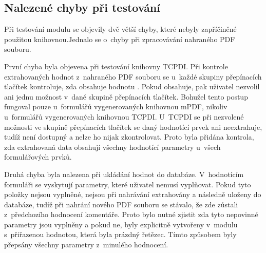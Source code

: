 \subsection{Nalezené chyby při testování}
Při testování modulu se objevily dvě větší chyby, které nebyly zapříčiněné použitou knihovnou.Jednalo se o~chyby při zpracovávání nahraného PDF souboru.
\par
První chyba byla objevena při testování knihovny TCPDI. Při kontrole extrahovaných hodnot z~nahraného PDF souboru se u~každé skupiny přepínacích tlačítek kontroluje, zda obsahuje hodnotu . Pokud obsahuje, pak uživatel nezvolil ani jednu možnost v~dané skupině přepínacích tlačítek. Bohužel tento postup fungoval pouze u~formulářů vygenerovaných knihovnou mPDF, nikoliv u~formulářů vygenerovaných knihovnou TCPDI. U~TCPDI se při nezvolené možnosti ve skupině přepínacích tlačítek se daný hodnotící prvek ani neextrahuje, tudíž není dostupný a nelze ho nijak zkontrolovat. Proto byla přidána kontrola, zda extrahovaná data obsahují všechny hodnotící parametry u~všech formulářových prvků.
\par
Druhá chyba byla nalezena při ukládání hodnot do databáze. V~hodnotícím formuláři se vyskytují parametry, které uživatel nemusí vyplňovat. Pokud tyto položky nejsou vyplněné, nejsou při nahrávání extrahovány a následně uloženy do databáze, tudíž při nahrání nového PDF souboru se stávalo, že zde zůstali z~předchozího hodnocení komentáře. Proto bylo nutné zjistit zda tyto nepovinné parametry jsou vyplněny a pokud ne, byly explicitně vytvořeny v~modulu s~přiřazenou hodnotou, která byla prázdný řetězec. Tímto způsobem byly přepsány všechny parametry z~minulého hodnocení.

